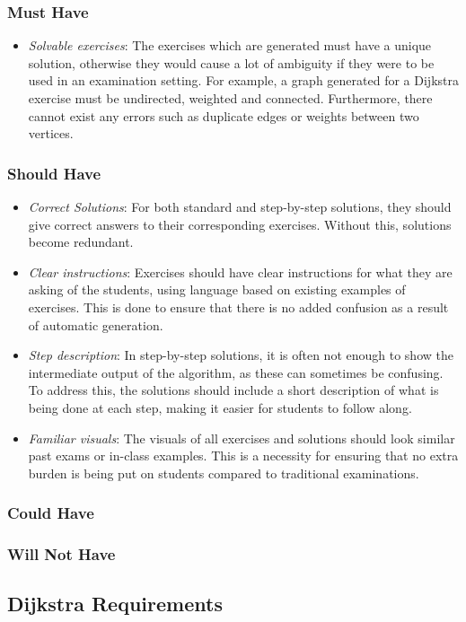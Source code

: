 \documentclass{l4proj}
\begin{document}
\subsubsection{Must Have}
\begin{itemize}
	\item
	\emph{Solvable exercises}: The exercises which are generated must have a unique solution, otherwise they would cause a lot of ambiguity if they were to be used in an examination setting. For example, a graph generated for a Dijkstra exercise must be undirected, weighted and connected. Furthermore, there cannot exist any errors such as duplicate edges or weights between two vertices.
\end{itemize}
\subsubsection{Should Have}
\begin{itemize}
	\item
	\emph{Correct Solutions}: For both standard and step-by-step solutions, they should give correct answers to their corresponding exercises. Without this, solutions become redundant.
	\item
	\emph{Clear instructions}: Exercises should have clear instructions for what they are asking of the students, using language based on existing examples of exercises. This is done to ensure that there is no added confusion as a result of automatic generation.
	\item
	\emph{Step description}: In step-by-step solutions, it is often not enough to show the intermediate output of the algorithm, as these can sometimes be confusing. To address this, the solutions should include a short description of what is being done at each step, making it easier for students to follow along. 
	\item
	\emph{Familiar visuals}: The visuals of all exercises and solutions should look similar past exams or in-class examples. This is a necessity for ensuring that no extra burden is being put on students compared to traditional examinations. 
\end{itemize}
\subsubsection{Could Have}
\subsubsection{Will Not Have}
\subsection{Dijkstra Requirements}
\end{document}
